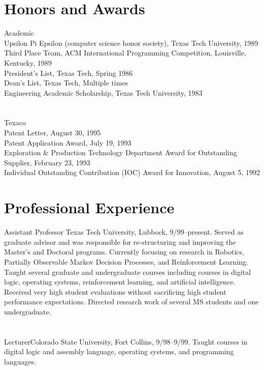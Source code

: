\documentclass[11pt]{resume}
\begin{document}
\section{Honors and Awards}  
{Academic}   
{\\
Upsilon Pi Epsilon (computer science honor society), Texas Tech University,
1989\\
Third Place Team, ACM International Programming Competition,
Louisville, Kentucky,  1989\\
President's List, Texas Tech, Spring 1986 \\
Dean's List, Texas Tech, Multiple times \\
Engineering Academic Scholarship, Texas Tech University, 1983}

\section{}
{Texaco}   
{\\Patent Letter, August 30, 1995\\
Patent Application Award, July 19, 1993 \\
Exploration \& Production Technology Department Award for 
Outstanding Supplier, February 23, 1993  \\
Individual Outstanding Contribution (IOC) Award for Innovation,
August 5, 1992}




\section{Professional Experience}
{Assistant Professor} {Texas Tech University, Lubbock, 9/99--present.
  Served as graduate advisor and was responsible for re-structuring and
  improving the Master's and Doctoral programs.  Currently focusing on
  research in Robotics, Partially Observable Markov Decision Processes, and
  Reinforcement Learning.  Taught several graduate and undergraduate
  courses including courses in digital logic, operating systems,
  reinforcement learning, and artificial intelligence.  Received very high
  student evaluations without sacrificing high student performance
  expectations.  Directed research work of several MS students
  and one undergraduate.}

\section{}
{Lecturer}{Colorado State University,
  Fort Collins, 9/98--9/99. Taught courses in digital
  logic and assembly language, operating systems, and programming
  languages.}
\end{document}
